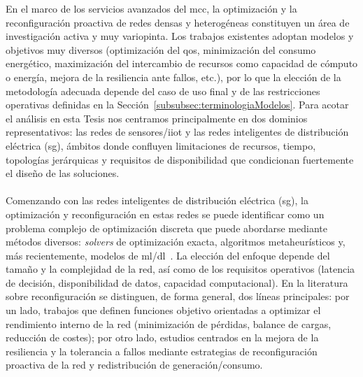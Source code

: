 En el marco de los servicios avanzados del \gls{mcc}, la optimización y la reconfiguración proactiva de redes densas y heterogéneas constituyen un área de investigación activa y muy variopinta. Los trabajos existentes adoptan modelos y objetivos muy diversos (optimización del \gls{qos}, minimización del consumo energético, maximización del intercambio de recursos como capacidad de cómputo o energía, mejora de la resiliencia ante fallos, etc.), por lo que la elección de la metodología adecuada depende del caso de uso final y de las restricciones operativas definidas en la Sección~\ref{subsubsec:terminologiaModelos}. Para acotar el análisis en esta Tesis nos centramos principalmente en dos dominios representativos: las redes de sensores/\gls{iiot} y las redes inteligentes de distribución eléctrica (\gls{sg}), ámbitos donde confluyen limitaciones de recursos, tiempo, topologías jerárquicas y requisitos de disponibilidad que condicionan fuertemente el diseño de las soluciones.\\
\\ %
Comenzando con las redes inteligentes de distribución eléctrica (\gls{sg}), la optimización y reconfiguración en estas redes se puede identificar como un problema complejo de optimización discreta que puede abordarse mediante métodos diversos: \textit{solvers} de optimización exacta, algoritmos metaheurísticos y, más recientemente, modelos de \gls{ml}/\gls{dl}~\cite{bhattarai2019big,koshy2021smart,kotsiopoulos2021machine}. La elección del enfoque depende del tamaño y la complejidad de la red, así como de los requisitos operativos (latencia de decisión, disponibilidad de datos, capacidad computacional). En la literatura sobre reconfiguración se distinguen, de forma general, dos líneas principales: por un lado, trabajos que definen funciones objetivo orientadas a optimizar el rendimiento interno de la red (minimización de pérdidas, balance de cargas, reducción de costes); por otro lado, estudios centrados en la mejora de la resiliencia y la tolerancia a fallos mediante estrategias de reconfiguración proactiva de la red y redistribución de generación/consumo.\\
\\
